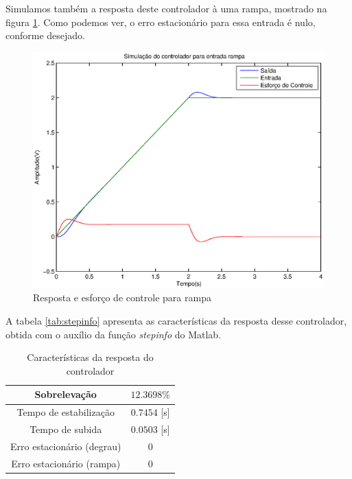 \documentclass{article}
\begin{document}
Simulamos também a resposta deste controlador à uma rampa, mostrado na figura \ref{fig:yurR}. Como podemos ver, o erro estacionário para essa entrada é nulo, conforme desejado.
\begin{figure}[H]
	\centering
	\includegraphics[width=0.8\linewidth]{../yurR}
	\caption{Resposta e esforço de controle para rampa}
	\label{fig:yurR}
\end{figure}
A tabela \ref{tab:stepinfo} apresenta as características da resposta desse controlador, obtida com o auxílio da função \textit{stepinfo} do Matlab.
\begin{table}[H]
	\centering
	\caption{Características da resposta do controlador}
	\label{tab:avat}
	\begin{tabular}{|c|c|}
		\hline Sobrelevação 				& $12.3698\%$ \\ 
		\hline Tempo de estabilização 		& $0.7454$ [s]\\ 
		\hline Tempo de subida				& $0.0503$ [s]\\ 
		\hline Erro estacionário (degrau) 	& $0$\\ 
		\hline Erro estacionário (rampa) 	& $0$\\ 
		\hline 
	\end{tabular} 
\end{table}
\begin{thebibliography}{widestlabel}
\end{thebibliography}
\end{document}
